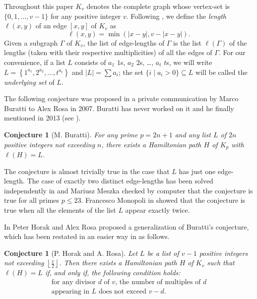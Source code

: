 \documentclass{amsart}
\newtheorem{conj}[prop]{Conjecture}
\theoremstyle{definition}
\numberwithin{equation}{section}
\begin{document}
Throughout this paper $K_v$ denotes the complete graph whose vertex-set is $\{0,1,\dots,v-1\}$ for any positive integer $v$.
Following \cite{HR}, we define the \emph{length} $\ell(x,y)$ of an edge $[x,y]$ of $K_v$ as
$$\ell(x,y)=\min(|x-y|,v-|x-y|).$$
Given a subgraph $\Gamma$ of $K_v$, the list of edge-lengths of $\Gamma$ is the list
$\ell(\Gamma)$ of the lengths (taken with their respective multiplicities) of  all the edges
of $\Gamma$. For our convenience, if a list $L$ consists of
$a_1$ $1$s, $a_2$ $2$s, \ldots, $a_t$ $t$s,
we will write $L=\left\{1^{a_1},2^{a_2},\ldots,t^{a_t}\right\}$ and $|L|=\sum a_i$;
the set $\{i \mid a_i>0\}\subseteq L$  will be called the \emph{underlying set} of $L$.

The following conjecture was proposed in a private communication by Marco Buratti to Alex Rosa in 2007.
Buratti has never worked on it and he finally mentioned in 2013 (see \cite[p. 14]{BM}).

\begin{conj}[M. Buratti]
For any prime $p=2n+1$ and any list $L$ of $2n$ positive integers not exceeding $n$, there exists a
Hamiltonian path $H$ of $K_p$ with $\ell(H)=L$.
\end{conj}

The conjecture is almost trivially true in the case that $L$ has just one edge-length.
The case of exactly two distinct edge-lengths has been solved
independently in \cite{DJ, HR} and Mariusz Meszka checked by computer that the conjecture is true for all primes $p\leq 23$.
Francesco Monopoli in \cite{M} showed that the conjecture is true when all the elements of the list $L$ appear exactly
twice.


In \cite{HR} Peter Horak and Alex Rosa proposed a generalization of Buratti's conjecture, which has been
restated in an easier way in \cite{PP1} as follows.


\begin{conj}[P. Horak and A. Rosa]\label{HR iff B}
Let $L$ be a list of $v-1$ positive integers not exceeding $\left\lfloor\frac{v}{2}\right\rfloor$.
Then there exists a Hamiltonian path $H$ of $K_v$ such that $\ell(H)=L$ if, and only if, the following condition holds:
\begin{equation}\label{B}
\left. \begin{array}{c}
\textrm{for any divisor $d$ of $v$, the number of multiples of $d$} \\
\textrm{appearing in $L$ does not exceed $v-d$.}
\end{array}\right.
\end{equation}
\end{conj}
\end{document}
